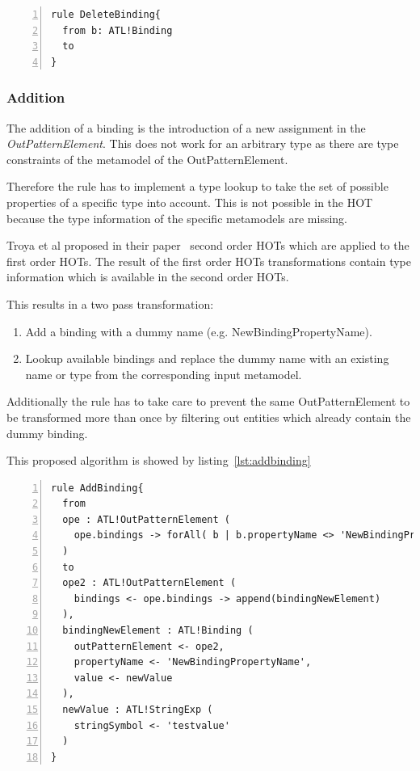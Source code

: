 \documentclass{llncs}
\begin{document}
\begin{lstlisting}[language=ATL, numbers=left,xleftmargin=5.0ex, caption=Definition of Delete-Binding., label=lst:delete]
rule DeleteBinding{
  from b: ATL!Binding
  to
}
\end{lstlisting}

\subsubsection{Addition}

The addition of a binding is the introduction of a new assignment in the \emph{OutPatternElement}. This does not work for an arbitrary type as there are type constraints of the metamodel of the OutPatternElement.

Therefore the rule has to implement a type lookup to take the set of possible properties of a specific type into account. This is not possible in the HOT because the type information of the specific metamodels are missing. 

Troya et al proposed in their paper~\cite{Bergmayr:2014} second order HOTs which are applied to the first order HOTs. The result of the first order HOTs transformations contain type information which is available in the second order HOTs.

This results in a two pass transformation:

\begin{enumerate}
	\item Add a binding with a dummy name (e.g. NewBindingPropertyName).
	\item Lookup available bindings and replace the dummy name with an existing name or type from the corresponding input metamodel.
\end{enumerate}

Additionally the rule has to take care to prevent the same OutPatternElement to be transformed more than once by filtering out entities which already contain the dummy binding.

This proposed algorithm is showed by listing~\ref{lst:addbinding}

\begin{lstlisting}[language=ATL, numbers=left,xleftmargin=5.0ex, caption=AddBinding-Definition, label=lst:addbinding]
rule AddBinding{
  from 
  ope : ATL!OutPatternElement ( 
    ope.bindings -> forAll( b | b.propertyName <> 'NewBindingPropertyName')
  )
  to
  ope2 : ATL!OutPatternElement (
    bindings <- ope.bindings -> append(bindingNewElement)
  ), 
  bindingNewElement : ATL!Binding (
    outPatternElement <- ope2,
    propertyName <- 'NewBindingPropertyName',
    value <- newValue	
  ),
  newValue : ATL!StringExp (
    stringSymbol <- 'testvalue'
  )	
}
\end{lstlisting}
\end{document}
